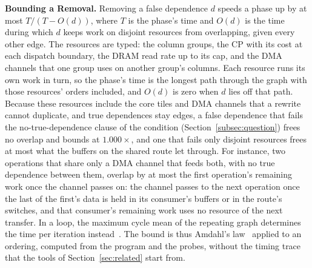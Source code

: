 \textbf{Bounding a Removal.}
\label{subsec:removal}
Removing a false dependence $d$ speeds a phase up by at most $T / (T - O(d))$, where $T$ is the phase's time and $O(d)$ is the time during which $d$ keeps work on disjoint resources from overlapping, given every other edge.
The resources are typed: the column groups, the CP with its cost at each dispatch boundary, the DRAM read rate up to its cap, and the DMA channels that one group uses on another group's columns.
Each resource runs its own work in turn, so the phase's time is the longest path through the graph with those resources' orders included, and $O(d)$ is zero when $d$ lies off that path.
Because these resources include the core tiles and DMA channels that a rewrite cannot duplicate, and true dependences stay edges, a false dependence that fails the no-true-dependence clause of the condition (Section~\ref{subsec:question}) frees no overlap and bounds at $1.000\times$, and one that fails only disjoint resources frees at most what the buffers on the shared route let through.
For instance, two operations that share only a DMA channel that feeds both, with no true dependence between them, overlap by at most the first operation's remaining work once the channel passes on: the channel passes to the next operation once the last of the first's data is held in its consumer's buffers or in the route's switches, and that consumer's remaining work uses no resource of the next transfer.
In a loop, the maximum cycle mean of the repeating graph determines the time per iteration instead~\citep{ghamarian2006throughput}.
The bound is thus Amdahl's law~\citep{amdahl1967validity} applied to an ordering, computed from the program and the probes, without the timing trace that the tools of Section~\ref{sec:related} start from.

